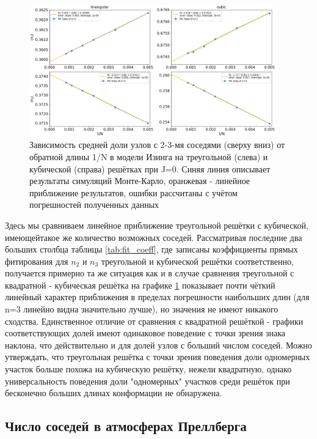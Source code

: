 \begin{figure}
    \centering
    \includegraphics[width=0.95\textwidth]{Sections/Images/triangle_vs_cubic_bulk.png}
    \caption{Зависимость средней доли узлов с 2-3-мя соседями (сверху вниз) от обратной длины 1/N в модели Изинга на треугольной (слева) и кубической (справа) решётках при J=0. Синяя линия описывает результаты симуляций Монте-Карло, оранжевая - линейное приближение результатов, ошибки рассчитаны с учётом погрешностей полученных данных}
    \label{fig:tr_vs_cb_bulk}
\end{figure}

Здесь мы сравниваем линейное приближение треугольной решётки с кубической, имеющейтакое же количество возможных соседей. Рассматривая последние два больших столбца таблицы \ref{tab:fit_coeff}, где записаны коэффициенты прямых фитирования для $n_{2}$ и $n_{3}$ треугольной и кубической решётки соответственно, получается примерно та же ситуация как и в случае сравнения треугольной с квадратной - кубическая решётка на графике \ref{fig:tr_vs_cb_bulk} показывает почти чёткий линейный характер приближения в пределах погрешности наибольших длин (для n=3 линейно видна значительно лучше), но значения не имеют никакого сходства. Единственное отличие от сравнения с квадратной решёткой - графики соответствующих долей имеют одинаковое поведение с точки зрения знака наклона, что действительно и для долей узлов с больший числом соседей. Можно утверждать, что треугольная решётка с точки зрения поведения доли одномерных участок больше похожа на кубическую решётку, нежели квадратную, однако универсальность поведения доли "одномерных" участков среди решёток при бесконечно больших длинах конформации не обнаружена.

\subsection{Число соседей в атмосферах Преллберга}

